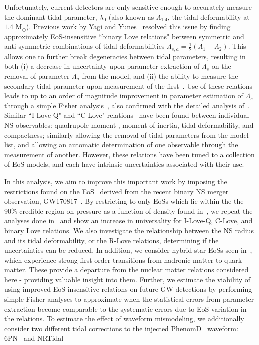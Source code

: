 \documentclass[prd,twocolumn,nofootinbib,superscriptaddress,amsmath,amssymb]{revtex4-1}
\begin{document}
Unfortunately, current detectors are only sensitive enough to accurately measure the dominant tidal parameter, $\lambda_0$ (also known as $\Lambda_{1.4}$, the tidal deformability at $1.4 \text{ M}_{\odot}$).
Previous work by Yagi and Yunes~\cite{Yagi:binLove} resolved this issue by finding approximately EoS-insensitive ``binary Love relations" between symmetric and anti-symmetric combinations of tidal deformabilities $\Lambda_{s,a}=\frac{1}{2}(\Lambda_1 \pm \Lambda_2)$.
This allows one to further break degeneracies between tidal parameters, resulting in both (i) a decrease in uncertainty upon parameter extraction of $\Lambda_s$ on the removal of parameter $\Lambda_a$ from the model, and (ii) the ability to measure the secondary tidal parameter upon measurement of the first~\cite{Katerina:residuals}.  
Use of these relations leads to up to an order of magnitude improvement in parameter estimation of $\Lambda_s$ through a simple Fisher analysis~\cite{Yagi:binLove}, also confirmed with the detailed analysis of~\cite{Katerina:residuals}.
Similar ``I-Love-Q" and ``C-Love" relations~\cite{Yagi:ILQ} have been found between individual NS observables: quadrupole moment , moment of inertia, tidal deformability, and compactness; similarly allowing the removal of tidal parameters from the model list, and allowing an automatic determination of one observable through the measurement of another.
However, these relations have been tuned to a collection of EoS models, and each have intrinsic uncertainties associated with their use.

In this analysis, we aim to improve this important work by imposing the restrictions found on the EoS~\cite{LIGO:posterior} derived from the recent binary NS merger observation, GW170817~\cite{TheLIGOScientific:2017qsa}.
By restricting to only EoSs which lie within the the 90\% credible region on pressure as a function of density found in~\cite{LIGO:posterior}, we repeat the analyses done in~\cite{Yagi:binLove,Yagi:ILQ} and show an increase in universality for I-Love-Q, C-Love, and binary Love relations.
We also investigate the relationship between the NS radius and its tidal deformability, or the R-Love relations, determining if the uncertainties can be reduced.
In addition, we consider hybrid star EoSs seen in~\cite{Paschalidis2018}, which experience strong first-order transitions from hadronic matter to quark matter.
These provide a departure from the nuclear matter relations considered here - providing valuable insight into them.
Further, we estimate the viability of using improved EoS-insensitive relations on future GW detections by performing simple Fisher analyses to approximate when the statistical errors from parameter extraction become comparable to the systematic errors due to EoS variation in the relations.
To estimate the effect of waveform mismodeling, we additionally consider two different tidal corrections to the injected PhenomD~\cite{PhenomDI,PhenomDII} waveform: 6PN~\cite{Wade:tidalCorrections} and NRTidal~\cite{Samajdar:NRTidal}
\end{document}
